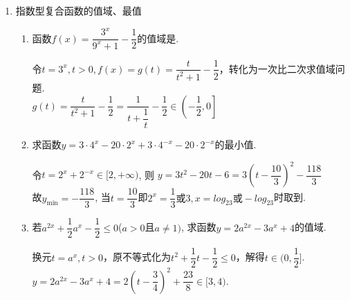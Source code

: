 \begin{enumerate}
\begin{enumerate}
        \item 已知 $f\left( x\right)  = \left\{  \begin{matrix} \left( {2 - a}\right) x + 1,\left( {x < 1}\right) \\  {a}^{x},\left( {x \geq  1}\right)  \end{matrix}\right.$ 是 $\mathbf{R}$ 上的严格增函数,那么实数 $a$ 的取值范围是
        \begin{jieda}
            $f\left( x\right)$ 在 $\mathrm{R}$ 上单调递增,所以 $\left\{  {\begin{matrix} 2 - a > 0 \\  a > 1 \\  f\left( 1\right)  = a \geq  \left( {2 - a}\right)  \times  1 + 1 \end{matrix} \Longrightarrow  \left\{  {\begin{matrix} a < 2 \\  a > 1 \\  a \geq  \dfrac{3}{2} \end{matrix} \Longrightarrow  \dfrac{3}{2} \leq  a < 2}\right. }\right.$
        \end{jieda}
    \end{enumerate}
    \item 指数型复合函数的值域、最值
    \begin{enumerate}
    \item 函数$f(x)=\dfrac{3^x}{9^x+1}-\dfrac{1}{2}$的值域是\blkda{$\left(-\dfrac{1}{2},0\right]$}. 
    \begin{jieda}
    令$t = 3^x, t > 0, f(x) = g(t) = \dfrac{t}{t^2+1} - \dfrac{1}{2}$，转化为一次比二次求值域问题. \\
    $g(t) = \dfrac{t}{t^2+1} - \dfrac{1}{2} = \dfrac{1}{t+\dfrac{1}{t}} - \dfrac{1}{2} \in \left(-\dfrac{1}{2},0\right]$
    \end{jieda}
    \item 求函数$y=3\cdot4^x-20\cdot2^x+3\cdot4^{-x}-20\cdot2^{-x}$的最小值. 
    \begin{jieda}
    令$t=2^x+2^{-x}\in[2,+\infty)$, 则
    $y = 3t^2-20t-6 = 3(t-\dfrac{10}{3})^2-\dfrac{118}{3}$ \\
    故$y_{\min}=-\dfrac{118}{3}$, 当$t=\dfrac{10}{3}$即$2^x = \dfrac{1}{3}\mbox{或}3, x=log_23 \mbox{或}-log_23$时取到. 
    \end{jieda}
    \item 若$a^{2x}+\dfrac{1}{2}a^x-\dfrac{1}{2}\leq 0$($a>0$且$a\neq 1)$, 求函数$y=2a^{2x}-3a^x+4$的值域. 
    \begin{jieda}
    换元$t = a^x, t > 0$，原不等式化为$t^2+\dfrac{1}{2}t-\dfrac{1}{2}\leq 0$，解得$t\in(0,\dfrac{1}{2}]$. \\
    $y=2a^{2x}-3a^x+4=2(t-\dfrac{3}{4})^2+\dfrac{23}{8}\in[3,4)$. 
    \end{jieda}
    

\end{enumerate}
\end{enumerate}
